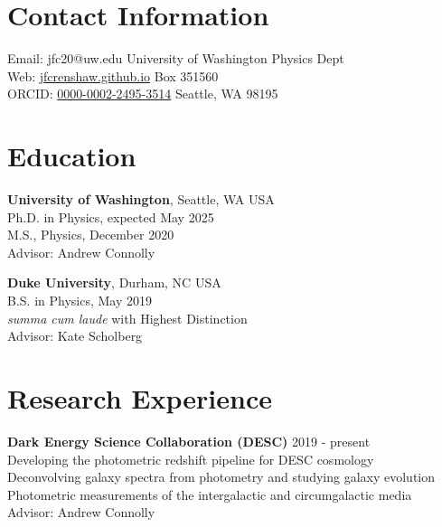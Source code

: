 \documentclass[margin, 11pt]{res}
\begin{document}

\begin{resume}

\section{Contact Information}
{Email: jfc20@uw.edu            \hfill University of Washington Physics Dept \\
Web: \href{https://jfcrenshaw.github.io}{jfcrenshaw.github.io}       \hfill Box 351560 \\
ORCID: \href{https://orcid.org/0000-0002-2495-3514} {0000-0002-2495-3514}     \hfill Seattle, WA 98195}

\section{Education}

\textbf{University of Washington}, Seattle, WA USA\\
Ph.D. in Physics, expected May 2025\\
M.S., Physics, December 2020\\
Advisor: Andrew Connolly

\textbf{Duke University}, Durham, NC USA \\
B.S. in Physics, May 2019\\
\textit{summa cum laude} with Highest Distinction \\
Advisor: Kate Scholberg


\section{Research Experience}

\textbf{Dark Energy Science Collaboration (DESC)} \hfill 2019 - present \\
Developing the photometric redshift pipeline for DESC cosmology \\
Deconvolving galaxy spectra from photometry and studying galaxy evolution \\
Photometric measurements of the intergalactic and circumgalactic media \\
Advisor: Andrew Connolly


\end{resume}
\end{document}
